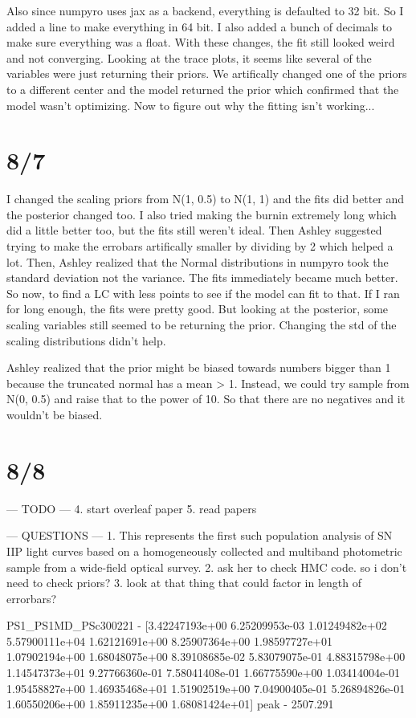 \documentclass[12pt]{article}
\begin{document}
Also since numpyro uses jax as a backend, everything is defaulted to 32 bit. So I added a line to make everything in 64 bit. I also added a bunch of decimals to make sure everything was a float. With these changes, the fit still looked weird and not converging. Looking at the trace plots, it seems like several of the variables were just returning their priors. We artifically changed one of the priors to a different center and the model returned the prior which confirmed that the model wasn't optimizing. Now to figure out why the fitting isn't working... 

\section{8/7}
I changed the scaling priors from N(1, 0.5) to N(1, 1) and the fits did better and the posterior changed too. I also tried making the burnin extremely long which did a little better too, but the fits still weren't ideal. Then Ashley suggested trying to make the errobars artifically smaller by dividing by 2 which helped a lot. Then, Ashley realized that the Normal distributions in numpyro took the standard deviation not the variance. The fits immediately became much better. So now, to find a LC with less points to see if the model can fit to that. If I ran for long enough, the fits were pretty good. But looking at the posterior, some scaling variables still seemed to be returning the prior. Changing the std of the scaling distributions didn't help. 

Ashley realized that the prior might be biased towards numbers bigger than 1 because the truncated normal has a mean > 1. Instead, we could try sample from N(0, 0.5) and raise that to the power of 10. So that there are no negatives and it wouldn't be biased. 


\section{8/8}


\iffalse
--- TODO --- 
4. start overleaf paper
5. read papers

--- QUESTIONS --- 
1. This represents the
first such population analysis of SN IIP light curves based on
a homogeneously collected and multiband photometric sample
from a wide-field optical survey.
2. ask her to check HMC code. so i don't need to check priors? 
3. look at that thing that could factor in length of errorbars?

PS1_PS1MD_PSc300221 - [3.42247193e+00 6.25209953e-03 1.01249482e+02 5.57900111e+04
 1.62121691e+00 8.25907364e+00 1.98597727e+01 1.07902194e+00
 1.68048075e+00 8.39108685e-02 5.83079075e-01 4.88315798e+00
 1.14547373e+01 9.27766360e-01 7.58041408e-01 1.66775590e+00
 1.03414004e-01 1.95458827e+00 1.46935468e+01 1.51902519e+00
 7.04900405e-01 5.26894826e-01 1.60550206e+00 1.85911235e+00
 1.68081424e+01]
peak - 2507.291
\end{document}

